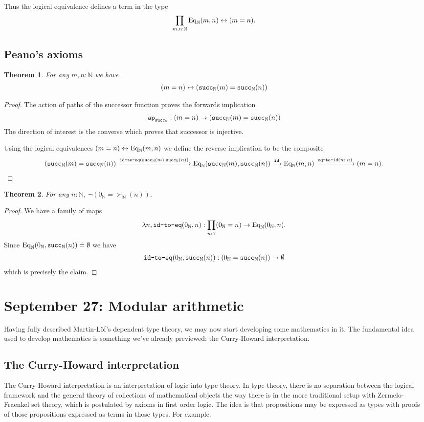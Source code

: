 \documentclass{amsart}
\theoremstyle{theorem}
\newtheorem*{thm}{Theorem}
\theoremstyle{definition}
\theoremstyle{remark}
\newcommand{\0}{\mathbbe{0}}
\newcommand{\1}{\mathbbe{1}}
\newcommand{\2}{\mathbbe{2}}
\newcommand{\3}{\mathbbe{3}}
\newcommand{\4}{\mathbbe{4}}
\newcommand{\term}[1]{{\textup{\texttt{#1}}}}
\newcommand{\id}{\term{id}}
\newcommand{\bN}{{\mathbb{N}}}
\newcommand{\suc}{\term{succ}_{\bN}}
\newcommand{\ap}{\term{ap}}
\newcommand{\Eq}{\textup{\text{Eq}}}
\begin{document}
Thus the logical equivalence defines a term in the type
\[ \prod_{m,n : \bN} \Eq_\bN(m,n) \leftrightarrow (m=n).\]

\subsection*{Peano's axioms}

\begin{thm} For any $m,n : \bN$ we have
\[ (m=n) \leftrightarrow (\suc(m) = \suc(n))\]
\end{thm}
\begin{proof}
The action of paths of the successor function proves the forwards implication
\[ \ap_{\suc} : (m=n) \to (\suc(m) = \suc(n))\]
The direction of interest is the converse which proves that successor is injective.

Using the logical equivalences $(m=n) \leftrightarrow \Eq_\bN(m,n)$ we define the reverse implication to be the composite
\[ (\suc(m) = \suc(n)) \xrightarrow{\term{id-to-eq}(\suc(m),\suc(n))} 
\Eq_\bN(\suc(m),\suc(n)) \xrightarrow{\id} \Eq_\bN(m,n) \xrightarrow{\term{eq-to-id}(m,n)} (m=n).\]
\end{proof}

\begin{thm} For any $n : \bN$, $\neg(0_\bN  = \succ_\bN(n))$.
\end{thm}
\begin{proof}
We have a family of maps
\[ \lambda n, \term{id-to-eq}(0_\bN,n) : \prod_{n : \bN} (0_\bN = n) \to \Eq_\bN(0_\bN,n).\]
Since $\Eq_\bN(0_\bN, \suc(n)) \doteq \emptyset$ we have
\[ \term{id-to-eq}(0_\bN,\suc(n)) : (0_\bN = \suc(n)) \to \emptyset\]
which is precisely the claim.
\end{proof}

\section*{September 27: Modular arithmetic}

Having fully described Martin-L\"{o}f's dependent type theory, we may now start developing some mathematics in it. The fundamental idea used to develop mathematics is something we've already previewed: the Curry-Howard interpretation.

\subsection*{The Curry-Howard interpretation}

The Curry-Howard interpretation is an interpretation of logic into type theory. In type theory, there is no separation between the logical framework and the general theory of collections of mathematical objects the way there is in the more traditional setup with Zermelo-Fraenkel set theory, which is postulated by axioms in first order logic. The idea is that propositions may be expressed as types with proofs of those propositions expressed as terms in those types. For example:
\end{document}
